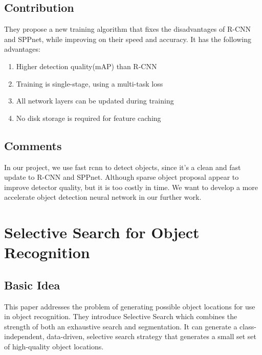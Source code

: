 \documentclass[a4paper]{article}
\begin{document}
      \subsection{Contribution}
        They propose a new training algorithm that fixes the disadvantages of R-CNN and SPPnet, while improving on their speed and accuracy. It has the following advantages:
        \begin{enumerate}
          \item Higher detection quality(mAP) than R-CNN
          \item Training is single-stage, using a multi-task loss
          \item All network layers can be updated during training
          \item No disk storage is required for feature caching
        \end{enumerate}
      \subsection{Comments}
        In our project, we use fast rcnn to detect objects, since it's a clean and fast update to R-CNN and SPPnet. Although sparse object proposal appear to improve detector quality, but it is too costly in time. We want to develop a more accelerate object detection neural network in our further work.  
    
  \section{Selective Search for Object Recognition}
      \subsection{Basic Idea}
        This paper addresses the problem of generating possible object locations for use in object recognition. They introduce Selective Search which combines the strength of both an exhaustive search and segmentation. It can generate a class-independent, data-driven, selective search strategy that generates a small set set of high-quality object locations.
\end{document}
